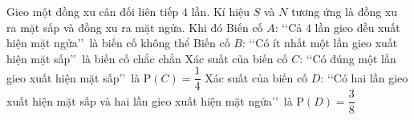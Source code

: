 \begin{ex}%
	Gieo một đồng xu cân đối liên tiếp $4$ lần. Kí hiệu $S$ và $N$ tương ứng là đồng xu ra mặt sấp và đồng xu ra mặt ngửa. Khi đó
	\choiceTF
	{Biến cố $A$: \lq\lq Cả $4$ lần gieo đều xuất hiện mặt ngửa\rq\rq\ là biến cố không thể}
	{Biến cố $B$: \lq\lq Có ít nhất một lần gieo xuất hiện mặt sấp\rq\rq\ là biến cố chắc chắn}
	{\True Xác suất của biến cố $C$: \lq\lq Có đúng một lần gieo xuất hiện mặt sấp\rq\rq\ là $\mathrm{P}(C)=\dfrac{1}{4}$}
	{\True Xác suất của biến cố $D$: \lq\lq Có hai lần gieo xuất hiện mặt sấp và hai lần gieo xuất hiện mặt ngửa\rq\rq\ là $\mathrm{P}(D)=\dfrac{3}{8}$}
\end{ex}

